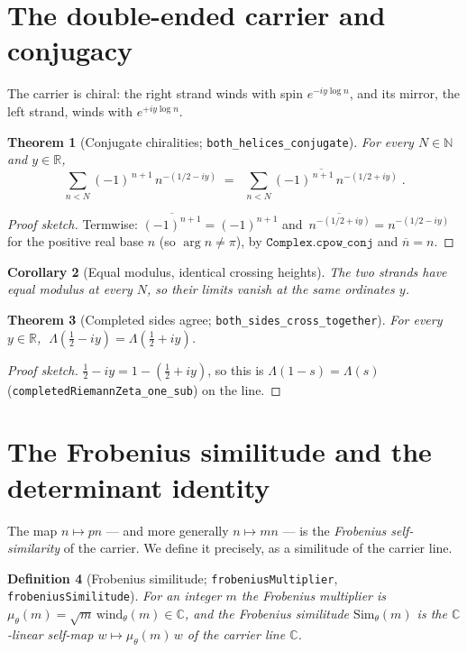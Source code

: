 \documentclass[11pt]{article}
\newtheorem{definition}{Definition}[section]
\newtheorem{theorem}[definition]{Theorem}
\newtheorem{corollary}[definition]{Corollary}
\DeclareMathOperator{\arglocal}{arg}
\newcommand{\C}{\mathbb{C}}
\newcommand{\R}{\mathbb{R}}
\newcommand{\N}{\mathbb{N}}
\newcommand{\conj}[1]{\overline{#1}}
\newcommand{\code}[1]{\texttt{#1}}
\begin{document}
\section{The double-ended carrier and conjugacy}\label{sec:double}

The carrier is chiral: the right strand winds with spin $e^{-iy\log n}$, and its mirror, the left
strand, winds with $e^{+iy\log n}$.

\begin{theorem}[Conjugate chiralities; \code{both\_helices\_conjugate}]\label{thm:conjhelix}
For every $N\in\N$ and $y\in\R$,
\[
  \sum_{n<N}(-1)^{\,n+1}\,n^{-(1/2-iy)}
   \;=\; \conj{\;\sum_{n<N}(-1)^{\,n+1}\,n^{-(1/2+iy)}\;}.
\]
\end{theorem}

\begin{proof}[Proof sketch]
Termwise: $\conj{(-1)^{n+1}}=(-1)^{n+1}$ and $\conj{\,n^{-(1/2+iy)}}=n^{-(1/2-iy)}$ for the positive
real base $n$ (so $\arglocal n\neq\pi$), by $\code{Complex.cpow\_conj}$ and $\conj n=n$.
\end{proof}

\begin{corollary}[Equal modulus, identical crossing heights]\label{cor:equalmod}
The two strands have equal modulus at every $N$, so their limits vanish at the same ordinates $y$.
\end{corollary}

\begin{theorem}[Completed sides agree; \code{both\_sides\_cross\_together}]\label{thm:bothsides}
For every $y\in\R$, $\;\Lambda(\tfrac12-iy)=\Lambda(\tfrac12+iy)$.
\end{theorem}

\begin{proof}[Proof sketch]
$\tfrac12-iy=1-(\tfrac12+iy)$, so this is $\Lambda(1-s)=\Lambda(s)$
(\code{completedRiemannZeta\_one\_sub}) on the line.
\end{proof}

\section{The Frobenius similitude and the determinant identity}\label{sec:det}

The map $n\mapsto pn$ --- and more generally $n\mapsto mn$ --- is the \emph{Frobenius
self-similarity} of the carrier. We define it precisely, as a similitude of the carrier line.

\begin{definition}[Frobenius similitude; \code{frobeniusMultiplier}, \code{frobeniusSimilitude}]\label{def:simil}
For an integer $m$ the \emph{Frobenius multiplier} is
$\mu_\theta(m)=\sqrt m\,\mathrm{wind}_\theta(m)\in\C$, and the \emph{Frobenius similitude}
$\mathrm{Sim}_\theta(m)$ is the $\C$-linear self-map $w\mapsto\mu_\theta(m)\,w$ of the carrier line $\C$.
\end{definition}
\end{document}

